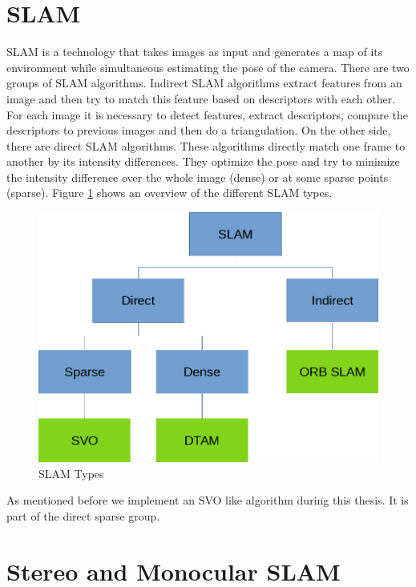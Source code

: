 \documentclass[11pt,a4paper,titlepage,oneside]{report}
\begin{document}
\section{SLAM}

SLAM is a technology that takes images as input and generates a map of its environment while simultaneous estimating the pose of the camera. There are two groups of SLAM algorithms. Indirect SLAM algorithms extract features from an image and then try to match this feature based on descriptors with each other. For each image it is necessary to detect features, extract descriptors, compare the descriptors to previous images and then do a triangulation. On the other side, there are direct SLAM algorithms. These algorithms directly match one frame to another by its intensity differences. They optimize the pose and try to minimize the intensity difference over the whole image (dense) or at some sparse points (sparse). Figure \ref{fig:slammodes} shows an overview of the different SLAM types.

\begin{figure}[H]
  \includegraphics[width=1.0\textwidth]{img/slam_modes.png}
  \caption{SLAM Types}\label{fig:slammodes}
\end{figure}

As mentioned before we implement an SVO like algorithm during this thesis. It is part of the direct sparse group.

\section{Stereo and Monocular SLAM}
\end{document}
